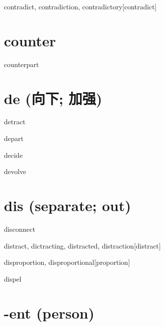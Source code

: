 \begin{wordRef}{contradict, contradiction, contradictory}[contradict]
\end{wordRef}

\section{counter}

\begin{wordRef}{counterpart}
\end{wordRef}

\section{de (向下; 加强)}

\begin{wordRef}{detract}
\end{wordRef}

\begin{wordRef}{depart}
\end{wordRef}

\begin{wordRef}{decide}
\end{wordRef}

\begin{wordRef}{devolve}
\end{wordRef}

\section{dis (separate; out)}

\begin{wordRef}{disconnect}
\end{wordRef}

\begin{wordRef}{distract, dictracting, distracted, distraction}[distract]
\end{wordRef}

\begin{wordRef}{disproportion, disproportional}[proportion]
\end{wordRef}

\begin{wordRef}{dispel}
    
\end{wordRef}

\section{-ent (person)}

